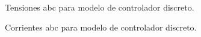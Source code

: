 \documentclass[a4paper, 10pt, onecolumn,journal]{ieeeconf}
\begin{document}
\begin{figure}[H]
	\centering
	\begin{adjustbox}{scale=0.7,max width=\columnwidth}
	\end{adjustbox}
	\caption{Tensiones abc para modelo de controlador discreto.}
	\label{Tensiones abc para modelo de controlador discreto}
\end{figure}
\begin{figure}[H]
	\centering
	\begin{adjustbox}{scale=0.7,max width=\columnwidth}
	\end{adjustbox}
	\caption{Corrientes abc para modelo de controlador discreto.}
	\label{Corrientes abc para modelo de controlador discreto}
\end{figure}
\end{document}
